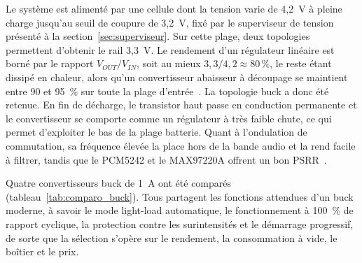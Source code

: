Le système est alimenté par une cellule dont la tension varie de 4,2~V à pleine charge jusqu'au seuil de coupure de 3,2~V, fixé par le superviseur de tension présenté à la section~\ref{sec:superviseur}. Sur cette plage, deux topologies permettent d'obtenir le rail 3,3~V. Le rendement d'un régulateur linéaire est borné par le rapport $V_{OUT}/V_{IN}$, soit au mieux $3{,}3/4{,}2 \approx 80\,\%$, le reste étant dissipé en chaleur, alors qu'un convertisseur abaisseur à découpage se maintient entre 90 et 95~\% sur toute la plage d'entrée~\cite{TI_TPS62A01}. La topologie buck a donc été retenue. En fin de décharge, le transistor haut passe en conduction permanente et le convertisseur se comporte comme un régulateur à très faible chute, ce qui permet d'exploiter le bas de la plage batterie. Quant à l'ondulation de commutation, sa fréquence élevée la place hors de la bande audio et la rend facile à filtrer, tandis que le PCM5242 et le MAX97220A offrent un bon PSRR~\cite{TI_PCM5242, analog_MAX97220A}.

Quatre convertisseurs buck de 1~A ont été comparés (tableau~\ref{tab:comparo_buck}). Tous partagent les fonctions attendues d'un buck moderne, à savoir le mode light-load automatique, le fonctionnement à 100~\% de rapport cyclique, la protection contre les surintensités et le démarrage progressif, de sorte que la sélection s'opère sur le rendement, la consommation à vide, le boîtier et le prix.

